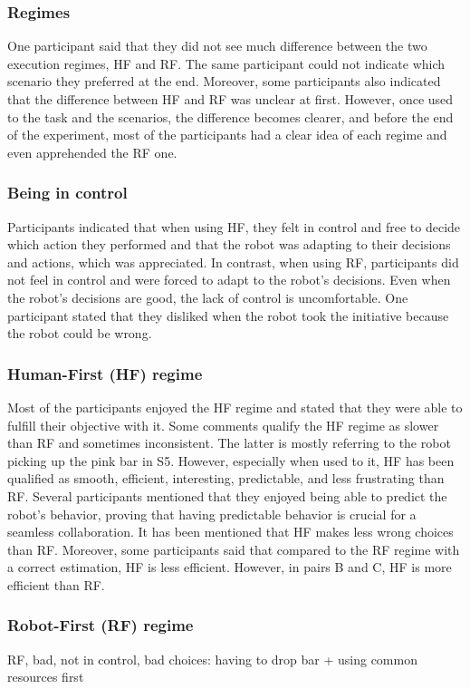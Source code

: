\subsubsection{Regimes}
One participant said that they did not see much difference between the two execution regimes, HF and RF. The same participant could not indicate which scenario they preferred at the end. Moreover, some participants also indicated that the difference between HF and RF was unclear at first. However, once used to the task and the scenarios, the difference becomes clearer, and before the end of the experiment, most of the participants had a clear idea of each regime and even apprehended the RF one.

\subsubsection{Being in control}
Participants indicated that when using HF, they felt in control and free to decide which action they performed and that the robot was adapting to their decisions and actions, which was appreciated. In contrast, when using RF, participants did not feel in control and were forced to adapt to the robot's decisions. Even when the robot's decisions are good, the lack of control is uncomfortable. One participant stated that they disliked when the robot took the initiative because the robot could be wrong. 

\subsubsection{Human-First (HF) regime}
Most of the participants enjoyed the HF regime and stated that they were able to fulfill their objective with it. Some comments qualify the HF regime as slower than RF and sometimes inconsistent. The latter is mostly referring to the robot picking up the pink bar in S5. However, especially when used to it, HF has been qualified as smooth, efficient, interesting, predictable, and less frustrating than RF. Several participants mentioned that they enjoyed being able to predict the robot's behavior, proving that having predictable behavior is crucial for a seamless collaboration. It has been mentioned that HF makes less wrong choices than RF.
Moreover, some participants said that compared to the RF regime with a correct estimation, HF is less efficient. However, in pairs B and C, HF is more efficient than RF.

\subsubsection{Robot-First (RF) regime}
RF, bad, not in control, bad choices: having to drop bar + using common resources first

